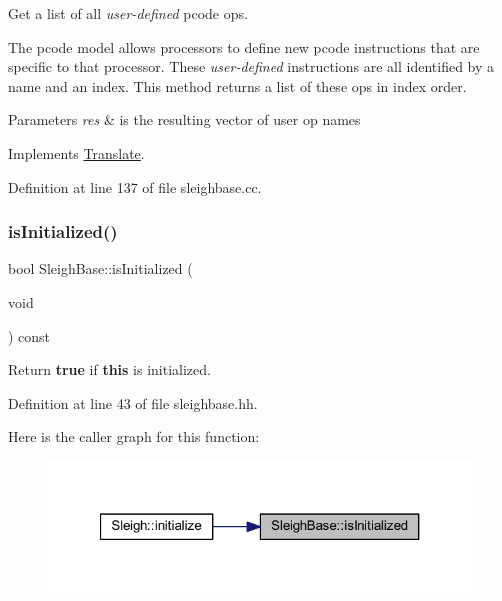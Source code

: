 Get a list of all {\itshape user-\/defined} pcode ops. 

The pcode model allows processors to define new pcode instructions that are specific to that processor. These {\itshape user-\/defined} instructions are all identified by a name and an index. This method returns a list of these ops in index order. 
\begin{DoxyParams}{Parameters}
{\em res} & is the resulting vector of user op names \\
\hline
\end{DoxyParams}


Implements \mbox{\hyperlink{class_translate_a2475ba8a71e0d514903b3b5458e6cf45}{Translate}}.



Definition at line 137 of file sleighbase.\+cc.

\mbox{\label{class_sleigh_base_a20fd6cc75489602f9dbb0cd272a7832c}} 
\subsubsection{\texorpdfstring{isInitialized()}{isInitialized()}}
{\footnotesize\ttfamily bool Sleigh\+Base\+::is\+Initialized (\begin{DoxyParamCaption}\item[{void}]{ }\end{DoxyParamCaption}) const\hspace{0.3cm}{\ttfamily [inline]}}



Return {\bfseries{true}} if {\bfseries{this}} is initialized. 



Definition at line 43 of file sleighbase.\+hh.

Here is the caller graph for this function\+:
\nopagebreak
\begin{figure}[H]
\begin{center}
\leavevmode
\includegraphics[width=321pt]{class_sleigh_base_a20fd6cc75489602f9dbb0cd272a7832c_icgraph}
\end{center}
\end{figure}
\mbox{\label{class_sleigh_base_a8d6034782b1d4ada68289054d4cdf8c3}} 
